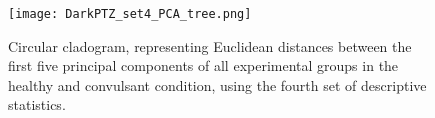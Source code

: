\documentclass[a4paper,12pt]{article}
\begin{document}
\begin{figure}[h!]
\begin{center}
\texttt{[image: DarkPTZ\_set4\_PCA\_tree.png]}
\caption{Circular cladogram, representing Euclidean distances between the first five principal components of all experimental groups in the healthy and convulsant condition, using the fourth set of descriptive statistics.}
\end{center}
\end{figure}
\end{document}
